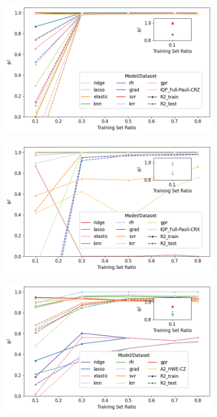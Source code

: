 \documentclass[journal=jacsat,manuscript=article]{achemso}
\begin{document}
\begin{figure}[H]
	\centering	
	\begin{subfigure}[b]{0.49\textwidth}
		\centering
		\includegraphics[width=\linewidth]{../images/Function_Fitting/linear_learning_curves.png}
		\caption{}
		\label{fig:linear_learning_curves}
	\end{subfigure}
	\hfill	
	\begin{subfigure}[b]{0.49\textwidth}
		\centering
		\includegraphics[width=\linewidth]{../images/Function_Fitting/quadratic_learning_curves.png}
		\caption{}
		\label{fig:quadratic_learning_curves}
	\end{subfigure}
	\hfill
	\begin{subfigure}[b]{0.49\textwidth}
		\centering
		\includegraphics[width=\linewidth]{../images/Function_Fitting/sine_learning_curves.png}

\end{subfigure}
\end{figure}
\end{document}
